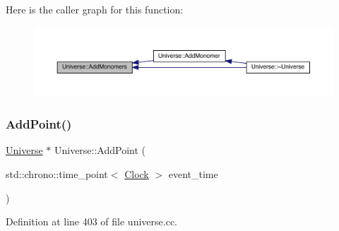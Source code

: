 Here is the caller graph for this function\+:
\nopagebreak
\begin{figure}[H]
\begin{center}
\leavevmode
\includegraphics[width=350pt]{class_universe_a95fe7f99971bb2048121a7c4e87b9f79_icgraph}
\end{center}
\end{figure}
\mbox{\label{class_universe_a8508b791c6997d8abcdcc037a6776734}} 
\subsubsection{\texorpdfstring{Add\+Point()}{AddPoint()}}
{\footnotesize\ttfamily \hyperlink{class_universe}{Universe} $\ast$ Universe\+::\+Add\+Point (\begin{DoxyParamCaption}\item[{std\+::chrono\+::time\+\_\+point$<$ \hyperlink{universe_8h_a0ef8d951d1ca5ab3cfaf7ab4c7a6fd80}{Clock} $>$}]{event\+\_\+time }\end{DoxyParamCaption})}



Definition at line 403 of file universe.\+cc.

